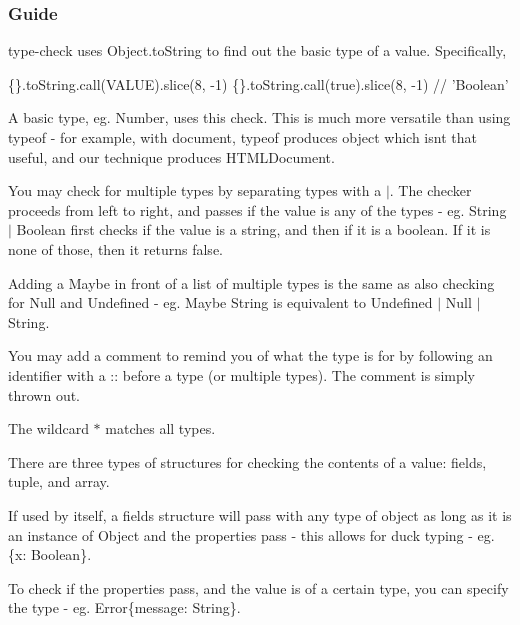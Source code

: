 \subsubsection*{Guide}

{\ttfamily type-\/check} uses {\ttfamily Object.\+to\+String} to find out the basic type of a value. Specifically,


\begin{DoxyCode}
\{\}.toString.call(VALUE).slice(8, -1)
\{\}.toString.call(\textcolor{keyword}{true}).slice(8, -1) \textcolor{comment}{// 'Boolean'}
\end{DoxyCode}
 A basic type, eg. {\ttfamily Number}, uses this check. This is much more versatile than using {\ttfamily typeof} -\/ for example, with {\ttfamily document}, {\ttfamily typeof} produces {\ttfamily \textquotesingle{}object\textquotesingle{}} which isn\textquotesingle{}t that useful, and our technique produces {\ttfamily \textquotesingle{}H\+T\+M\+L\+Document\textquotesingle{}}.

You may check for multiple types by separating types with a {\ttfamily $\vert$}. The checker proceeds from left to right, and passes if the value is any of the types -\/ eg. {\ttfamily String $\vert$ Boolean} first checks if the value is a string, and then if it is a boolean. If it is none of those, then it returns false.

Adding a {\ttfamily Maybe} in front of a list of multiple types is the same as also checking for {\ttfamily Null} and {\ttfamily Undefined} -\/ eg. {\ttfamily Maybe String} is equivalent to {\ttfamily Undefined $\vert$ Null $\vert$ String}.

You may add a comment to remind you of what the type is for by following an identifier with a {\ttfamily \+:\+:} before a type (or multiple types). The comment is simply thrown out.

The wildcard {\ttfamily $\ast$} matches all types.

There are three types of structures for checking the contents of a value\+: \textquotesingle{}fields\textquotesingle{}, \textquotesingle{}tuple\textquotesingle{}, and \textquotesingle{}array\textquotesingle{}.

If used by itself, a \textquotesingle{}fields\textquotesingle{} structure will pass with any type of object as long as it is an instance of {\ttfamily Object} and the properties pass -\/ this allows for duck typing -\/ eg. {\ttfamily \{x\+: Boolean\}}.

To check if the properties pass, and the value is of a certain type, you can specify the type -\/ eg. {\ttfamily Error\{message\+: String\}}.

